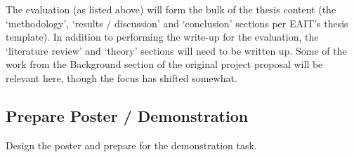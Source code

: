 The evaluation (as listed above) will form the bulk of the thesis content (the `methodology', `results / discussion' and `conclusion' sections per EAIT's thesis template). In addition to performing the write-up for the evaluation, the `literature review' and `theory' sections will need to be written up. Some of the work from the Background section of the original project proposal will be relevant here, though the focus has shifted somewhat.

\subsection*{Prepare Poster / Demonstration}

Design the poster and prepare for the demonstration task.


